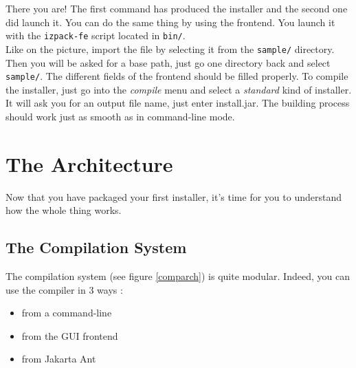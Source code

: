 There you are! The first command has produced the installer and the
second one did launch it. You can do the same thing by using the
frontend. You launch it with the \texttt{izpack-fe} script located in
\texttt{bin/}.\\

Like on
the picture, import the file by selecting it from the \texttt{sample/}
directory. Then you will be asked for a base path, just go one directory
back and select \texttt{sample/}. The different fields of the frontend
should be filled properly. To compile the installer, just go into the
\textit{compile} menu and select a \textit{standard} kind of installer.
It will ask you for an output file name, just enter install.jar. The
building process should work just as smooth as in command-line mode.\\

\section{The \IzPack Architecture}

Now that you have packaged your first installer, it's time for you to understand
how the whole thing works.\\

\subsection{The Compilation System}

The compilation system (see figure \ref{comparch}) is quite modular. 
Indeed, you can use the compiler in 3 ways :
\begin{itemize}
  \item from a command-line
  \item from the GUI frontend
  \item from Jakarta Ant
\end{itemize}\

